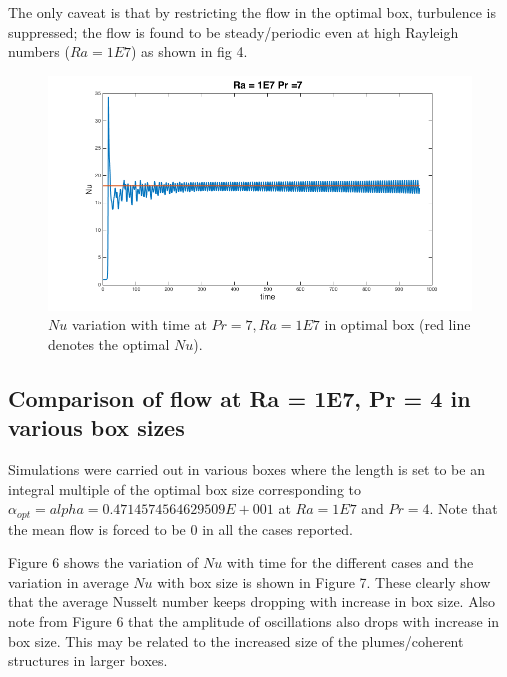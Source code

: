 \documentclass[12pt]{article}
\begin{document}
      
      The only caveat is that by restricting the flow in the optimal box, turbulence is suppressed; the flow is found to be steady/periodic even at high Rayleigh numbers ($Ra = 1E7$) as shown in fig 4.
      
      \begin{figure}[!htb]
      	\includegraphics[width=\linewidth]{Nu1E77opt.png}
      	\caption{$Nu$ variation with time at $Pr = 7, Ra = 1E7$ in optimal box (red line denotes the optimal $Nu$).}
      	\label{fig:fig5}
      \end{figure}  
      
      \subsection{Comparison of flow at Ra = 1E7, Pr = 4 in various box sizes}
      
      Simulations were carried out in various boxes where the length is set to be an integral multiple of the optimal box size corresponding to $\alpha_{opt} = alpha = 0.4714574564629509E+001$ at $Ra = 1E7$ and $Pr = 4$. Note that the mean flow is forced to be 0 in all the cases reported.
      
      Figure 6 shows the variation of $Nu$ with time for the different cases and the variation in average $Nu$ with box size is shown in Figure 7. These clearly show that the average Nusselt number keeps dropping with increase in box size. Also note from Figure 6 that the amplitude of oscillations also drops with increase in box size. This may be related to the increased size of the plumes/coherent structures in larger boxes.
      
\end{document}
